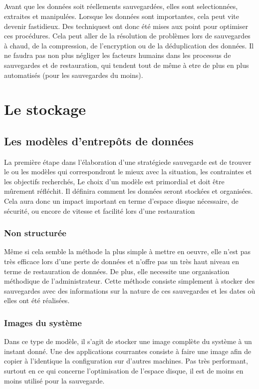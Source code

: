 \documentclass[a4paper,11pt]{report}
\begin{document}
\paragraph{}
Avant que les données soit réellements sauvegardées, elles sont selectionnées, extraites et manipulées. Lorsque les données sont importantes, cela peut vite devenir fastidieux.
Des techniquest ont donc été mises aux point pour optimiser ces procédures. Cela peut aller de la résolution de problèmes lors de sauvegardes à chaud, de la compression, de l'encryption ou de la déduplication des données.
Il ne faudra pas non plus négliger les facteurs humains dans les processus de sauvegardes et de restauration, qui tendent tout de même à etre de plus en plus automatisés (pour les sauvegardes du moins).


\chapter{Le stockage}

\section{Les modèles d'entrepôts de données}
La première étape dans l'élaboration d'une stratégiede sauvegarde est de trouver le ou les modèles qui correspondront le mieux avec la situation, les contraintes et les objectifs recherchés, 
Le choix d'un modèle est primordial et doit être mûrement réfléchit. Il définira comment les données seront stockées et organisées. Cela aura donc un impact important en terme d'espace disque nécessaire, de sécurité, ou encore de vitesse et facilité lors d'une restauration

\subsection{Non structurée}
Même si cela semble la méthode la plus simple à mettre en oeuvre, elle n'est pas très efficace lors d'une perte de données et n'offre pas un très haut niveau en terme de restauration de données.
De plus, elle necessite une organisation méthodique de l'administrateur.
Cette méthode consiste simplement à stocker des sauvegardes avec des informations sur la nature de ces sauvegardes et les dates où elles ont été réalisées.

\subsection{Images du système}
Dans ce type de modèle, il s'agit de stocker une image complète du système à un instant donné. Une des applications courrantes consiste à faire une image afin de copier à l'identique la configuration sur d'autres machines.
Pas très performant, surtout en ce qui concerne l'optimisation de l'espace disque, il est de moins en moins utilisé pour la sauvegarde.
\end{document}

